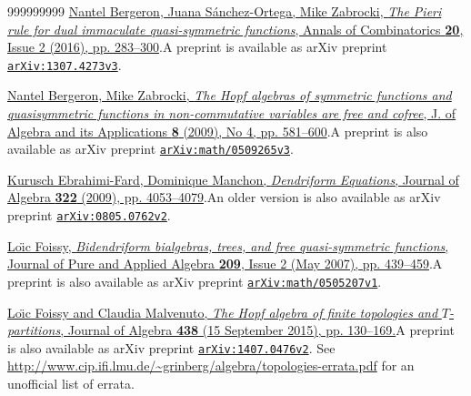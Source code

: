 \documentclass
[numbers=enddot,12pt,final,onecolumn,notitlepage,abstracton]{scrartcl}%
\theoremstyle{definition}
\begin{document}
\begin{thebibliography}{999999999}
%
\href{https://doi.org/10.1007/s00026-016-0303-3}{Nantel Bergeron, Juana
S\'{a}nchez-Ortega, Mike Zabrocki, \textit{The Pieri rule for dual immaculate
quasi-symmetric functions}, Annals of Combinatorics \textbf{20}, Issue 2
(2016), pp. 283--300}.\newline A preprint is available as arXiv preprint
\texttt{\href{https://arxiv.org/abs/1307.4273v3}{arXiv:1307.4273v3}}.

%
\href{https://doi.org/10.1142/S0219498809003485}{Nantel Bergeron, Mike
Zabrocki, \textit{The Hopf algebras of symmetric functions and quasisymmetric
functions in non-commutative variables are free and cofree}, J. of Algebra and
its Applications \textbf{8} (2009), No 4, pp. 581--600}.\newline A preprint is
also available as arXiv preprint
\texttt{\href{https://arxiv.org/abs/math/0509265v3}{arXiv:math/0509265v3}}.



%
\href{https://doi.org/10.1016/j.jalgebra.2009.06.002}{Kurusch Ebrahimi-Fard,
Dominique Manchon, \textit{Dendriform Equations}, Journal of Algebra
\textbf{322} (2009), pp. 4053--4079}.\newline An older version is also
available as arXiv preprint
\texttt{\href{https://arxiv.org/abs/0805.0762v2}{arXiv:0805.0762v2}}.

%
\href{https://doi.org/10.1016/j.jpaa.2006.06.005}{Lo\"{\i}c Foissy,
\textit{Bidendriform bialgebras, trees, and free quasi-symmetric functions},
Journal of Pure and Applied Algebra \textbf{209}, Issue 2 (May 2007), pp.
439--459}.\newline A preprint is also available as arXiv preprint
\texttt{\href{https://arxiv.org/abs/math/0505207v1}{arXiv:math/0505207v1}}.

%
\href{https://doi.org/10.1016/j.jalgebra.2015.04.024}{Lo\"{\i}c Foissy and
Claudia Malvenuto, \textit{The Hopf algebra of finite topologies and }%
$T$\textit{-partitions}, Journal of Algebra \textbf{438} (15 September 2015),
pp. 130--169.}\newline A preprint is also available as arXiv preprint
\texttt{\href{https://arxiv.org/abs/1407.0476v2}{arXiv:1407.0476v2}}.\newline
See \url{http://www.cip.ifi.lmu.de/~grinberg/algebra/topologies-errata.pdf}
for an unofficial list of errata.


\end{thebibliography}
\end{document}
